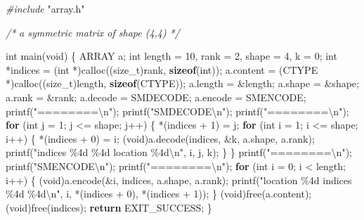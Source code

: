 \documentclass[
  12pt,
]{article}
\newenvironment{Shaded}{\begin{snugshade}}{\end{snugshade}}
\newcommand{\CommentTok}[1]{\textcolor[rgb]{0.56,0.35,0.01}{\textit{#1}}}
\newcommand{\ControlFlowTok}[1]{\textcolor[rgb]{0.13,0.29,0.53}{\textbf{#1}}}
\newcommand{\DataTypeTok}[1]{\textcolor[rgb]{0.13,0.29,0.53}{#1}}
\newcommand{\DecValTok}[1]{\textcolor[rgb]{0.00,0.00,0.81}{#1}}
\newcommand{\ImportTok}[1]{#1}
\newcommand{\KeywordTok}[1]{\textcolor[rgb]{0.13,0.29,0.53}{\textbf{#1}}}
\newcommand{\NormalTok}[1]{#1}
\newcommand{\PreprocessorTok}[1]{\textcolor[rgb]{0.56,0.35,0.01}{\textit{#1}}}
\newcommand{\SpecialCharTok}[1]{\textcolor[rgb]{0.00,0.00,0.00}{#1}}
\newcommand{\StringTok}[1]{\textcolor[rgb]{0.31,0.60,0.02}{#1}}
\begin{document}
\begin{Shaded}
\begin{Highlighting}[]
\PreprocessorTok{\#include }\ImportTok{"array.h"}

\CommentTok{/*}
\CommentTok{  a symmetric matrix of shape (4,4)}
\CommentTok{*/}

\DataTypeTok{int}\NormalTok{ main(}\DataTypeTok{void}\NormalTok{) \{}
\NormalTok{  ARRAY a;}
  \DataTypeTok{int}\NormalTok{ length = }\DecValTok{10}\NormalTok{, rank = }\DecValTok{2}\NormalTok{, shape = }\DecValTok{4}\NormalTok{, k = }\DecValTok{0}\NormalTok{;}
  \DataTypeTok{int}\NormalTok{ *indices = (}\DataTypeTok{int}\NormalTok{ *)calloc((}\DataTypeTok{size\_t}\NormalTok{)rank, }\KeywordTok{sizeof}\NormalTok{(}\DataTypeTok{int}\NormalTok{));}
\NormalTok{  a.content = (CTYPE *)calloc((}\DataTypeTok{size\_t}\NormalTok{)length, }\KeywordTok{sizeof}\NormalTok{(CTYPE));}
\NormalTok{  a.length = \&length;}
\NormalTok{  a.shape = \&shape;}
\NormalTok{  a.rank = \&rank;}
\NormalTok{  a.decode = SMDECODE;}
\NormalTok{  a.encode = SMENCODE;}
\NormalTok{  printf(}\StringTok{"========}\SpecialCharTok{\textbackslash{}n}\StringTok{"}\NormalTok{);}
\NormalTok{  printf(}\StringTok{"SMDECODE}\SpecialCharTok{\textbackslash{}n}\StringTok{"}\NormalTok{);}
\NormalTok{  printf(}\StringTok{"========}\SpecialCharTok{\textbackslash{}n}\StringTok{"}\NormalTok{);}
  \ControlFlowTok{for}\NormalTok{ (}\DataTypeTok{int}\NormalTok{ j = }\DecValTok{1}\NormalTok{; j \textless{}= shape; j++) \{}
\NormalTok{    *(indices + }\DecValTok{1}\NormalTok{) = j;}
    \ControlFlowTok{for}\NormalTok{ (}\DataTypeTok{int}\NormalTok{ i = }\DecValTok{1}\NormalTok{; i \textless{}= shape; i++) \{}
\NormalTok{      *(indices + }\DecValTok{0}\NormalTok{) = i;}
\NormalTok{      (}\DataTypeTok{void}\NormalTok{)a.decode(indices, \&k, a.shape, a.rank);}
\NormalTok{      printf(}\StringTok{"indices \%4d \%4d location \%4d}\SpecialCharTok{\textbackslash{}n}\StringTok{"}\NormalTok{, i, j, k);}
\NormalTok{    \}}
\NormalTok{  \}}
\NormalTok{  printf(}\StringTok{"========}\SpecialCharTok{\textbackslash{}n}\StringTok{"}\NormalTok{);}
\NormalTok{  printf(}\StringTok{"SMENCODE}\SpecialCharTok{\textbackslash{}n}\StringTok{"}\NormalTok{);}
\NormalTok{  printf(}\StringTok{"========}\SpecialCharTok{\textbackslash{}n}\StringTok{"}\NormalTok{);}
  \ControlFlowTok{for}\NormalTok{ (}\DataTypeTok{int}\NormalTok{ i = }\DecValTok{0}\NormalTok{; i \textless{} length; i++) \{}
\NormalTok{    (}\DataTypeTok{void}\NormalTok{)a.encode(\&i, indices, a.shape, a.rank);}
\NormalTok{    printf(}\StringTok{"location \%4d indices \%4d \%4d}\SpecialCharTok{\textbackslash{}n}\StringTok{"}\NormalTok{, i, *(indices + }\DecValTok{0}\NormalTok{), *(indices + }\DecValTok{1}\NormalTok{));}
\NormalTok{  \}}
\NormalTok{  (}\DataTypeTok{void}\NormalTok{)free(a.content);}
\NormalTok{  (}\DataTypeTok{void}\NormalTok{)free(indices);}
  \ControlFlowTok{return}\NormalTok{ EXIT\_SUCCESS;}
\NormalTok{\}}
\end{Highlighting}
\end{Shaded}
\end{document}
